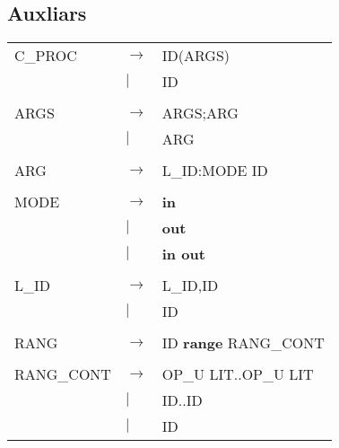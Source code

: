 \documentclass{article}
\begin{document}
	\subsection{Auxliars}
	\begin{tabular}{l l l}
		C\_PROC&$\to$&ID(ARGS)\\
		&$|$&ID\\
		\\
		ARGS&$\to$&ARGS;ARG\\
		&$|$&ARG\\
		\\
		ARG&$\to$&L\_ID:MODE ID\\
		\\
		MODE&$\to$&\textbf{in}\\
		&$|$&\textbf{out}\\
		&$|$&\textbf{in out}\\
		\\
		L\_ID&$\to$&L\_ID,ID\\
		&$|$&ID\\
		\\
		RANG&$\to$&ID \textbf{range} RANG\_CONT\\
		\\
		RANG\_CONT&$\to$&OP\_U LIT..OP\_U LIT\\
		&$|$&ID..ID\\
		&$|$&ID
	\end{tabular}
\end{document}
